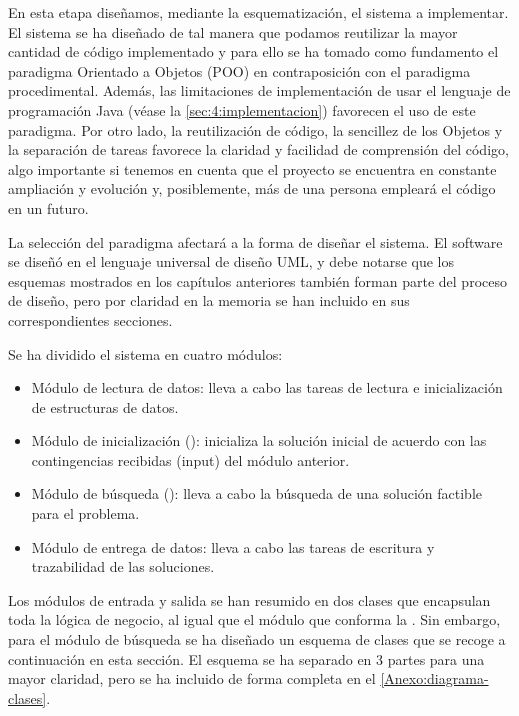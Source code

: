 En esta etapa diseñamos, mediante la esquematización, el sistema a implementar. 
El sistema se ha diseñado de tal manera que podamos reutilizar la mayor cantidad de código implementado y para ello se ha tomado como fundamento el paradigma Orientado a Objetos (POO) en contraposición con el paradigma procedimental. 
Además, las limitaciones de implementación de usar el lenguaje de programación Java (véase la \autoref{sec:4:implementacion}) favorecen el uso de este paradigma. 
Por otro lado, la reutilización de código, la sencillez de los Objetos y la separación de tareas favorece la claridad y facilidad de comprensión del código, algo importante si tenemos en cuenta que el proyecto se encuentra en constante ampliación y evolución y, posiblemente, más de una persona empleará el código en un futuro. 

La selección del paradigma afectará a la forma de diseñar el sistema. El software se diseñó en el lenguaje universal de diseño UML, y debe notarse que los esquemas mostrados en los capítulos anteriores también forman parte del proceso de diseño, pero por claridad en la memoria se han incluido en sus correspondientes secciones.

Se ha dividido el sistema en cuatro módulos:
\begin{itemize}
	\item Módulo de lectura de datos: lleva a cabo las tareas de lectura e inicialización de estructuras de datos.
	\item Módulo de inicialización (\faseuno{}): inicializa la solución inicial de acuerdo con las contingencias recibidas (input) del módulo anterior.
	\item Módulo de búsqueda (\fasedos{}): lleva a cabo la búsqueda de una solución factible para el problema.
	\item Módulo de entrega de datos: lleva a cabo las tareas de escritura y trazabilidad de las soluciones.
\end{itemize}

Los módulos de entrada y salida se han resumido en dos clases que encapsulan toda la lógica de negocio, al igual que el módulo que conforma la \faseuno{}. Sin embargo, para el módulo de búsqueda se ha diseñado un esquema de clases que se recoge a continuación en esta sección. El esquema se ha separado en 3 partes para una mayor claridad, pero se ha incluido de forma completa en el \autoref{Anexo:diagrama-clases}. 

